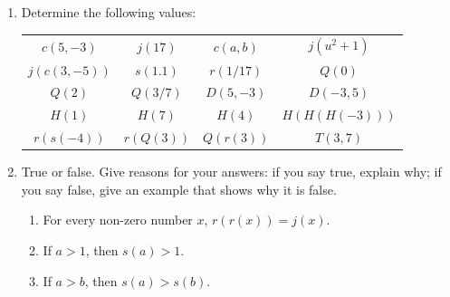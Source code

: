 \begin{enumerate}
The next four questions refer to these functions: 
\begin{alignat*}{2}
 c(x, y) &=  17 & &\mbox{a constant function} \\
    j(z) &= z  &  &\mbox{the identity function} \\
    r(u) &= 1/u & & \mbox{the reciprocal function} \\
    D(p,q) &= p - q & &\mbox{the difference function}\\
    s(y) &= y^2 & &\mbox{the squaring function}\\ 
   Q(v) &= \dfrac{2v+1}{3v-6} & &\mbox{a rational function}\\
   H(x) &= \begin{cases}
	5 & \text{if $x < 0$} \\
	x^2 + 2 & \text{if $0 \leq x < 6$} \\
	29 - x & \text{if $6 \leq x$}
	   \end{cases}  & & \\
   T(x, y) &= r(x) + Q(y) & &
\end{alignat*}



\item Determine the following values:
\begin{center}


\begin{tabular}{cccc}
$c(5,-3)$    & $j(17)$   & $c(a,b)$    & $j(u^2+1)$ \\[.05in]
$j(c(3,-5))$ & $s(1.1)$  & $r(1/17)$     & $Q(0)$ \\[.05in]
$Q(2)$       & $Q(3/7)$  & $D(5,-3)$ & $D(-3,5)$ \\[.05in]
$H(1)$       &  $H(7)$   &  $H(4)$ & $H(H(H(-3)))$ \\[.05in]
$r(s(-4))$   & $r(Q(3))$ & $Q(r(3))$ & $T(3, 7)$ 
	\end{tabular}
\end{center}


\item True or false.  Give reasons for your answers: if you say true,
explain why; if you say false, give an example that shows why it is
false.

  \begin{enumerate}
  \item For every non-zero number $x$, $r(r(x)) = j(x)$.

  \item If $a > 1$, then $s(a) > 1$.

  \item If $a > b$, then $s(a) > s(b)$.


\end{enumerate}
\end{enumerate}
